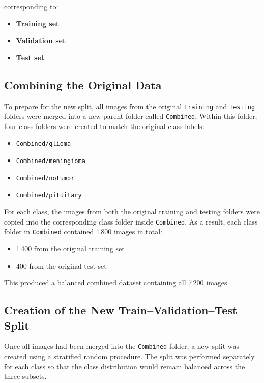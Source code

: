 \documentclass{article}
\begin{document}
corresponding to:

\begin{itemize}
    \item \textbf{Training set}
    \item \textbf{Validation set}
    \item \textbf{Test set}
\end{itemize}

\subsection{Combining the Original Data}

To prepare for the new split, all images from the original \texttt{Training} and \texttt{Testing} folders were merged into a new parent folder called \texttt{Combined}. Within this folder, four class folders were created to match the original class labels:

\begin{itemize}
    \item \texttt{Combined/glioma}
    \item \texttt{Combined/meningioma}
    \item \texttt{Combined/notumor}
    \item \texttt{Combined/pituitary}
\end{itemize}

For each class, the images from both the original training and testing folders were copied into the corresponding class folder inside \texttt{Combined}. As a result, each class folder in \texttt{Combined} contained 1\,800 images in total:

\begin{itemize}
    \item 1\,400 from the original training set
    \item 400 from the original test set
\end{itemize}

This produced a balanced combined dataset containing all 7\,200 images.

\subsection{Creation of the New Train--Validation--Test Split}

Once all images had been merged into the \texttt{Combined} folder, a new split was created using a stratified random procedure. The split was performed separately for each class so that the class distribution would remain balanced across the three subsets.
\end{document}
